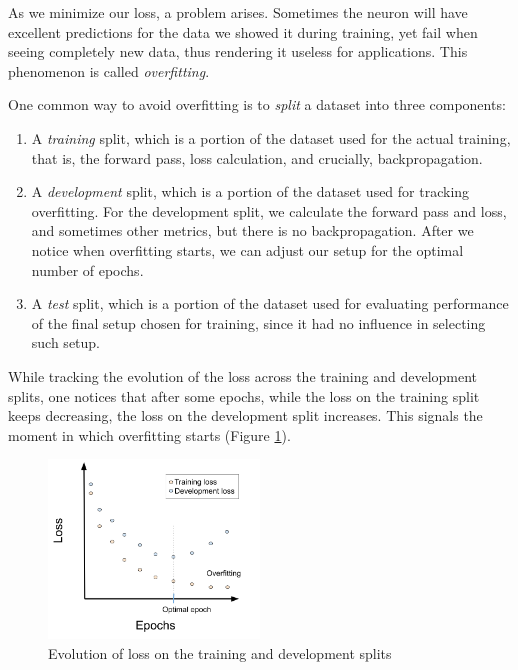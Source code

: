 
\label{02_nn_overfitting}

As we minimize our loss, a problem arises. Sometimes the neuron will have excellent predictions for the data we showed it during training, yet  fail when seeing completely new data, thus rendering it useless for applications. This phenomenon is called \emph{overfitting}. 

One common way to avoid overfitting is to \emph{split} a dataset into three components:

\begin{enumerate}
    \item A \emph{training} split, which is a portion of the dataset used for the actual training, that is, the forward pass, loss calculation, and crucially, backpropagation.
    \item A \emph{development} split, which is a portion of the dataset used for tracking overfitting. For the development split, we calculate the forward pass and loss, and sometimes other metrics, but there is no backpropagation. After we notice when overfitting starts, we can adjust our setup for the optimal number of epochs.
    \item A \emph{test} split, which is a portion of the dataset used for evaluating performance of the final setup chosen for training, since it had no influence in selecting such setup.
\end{enumerate}

While tracking the evolution of the loss across the training and development splits, one notices that after some epochs, while the loss on the training split keeps decreasing, the loss on the development split increases. This signals the moment in which overfitting starts (Figure \ref{fig:02_nn_split_loss_evolution}).

\begin{figure}
    \centering
    \includegraphics[width=0.5\textwidth]{Figures/02/02_split_loss_evolution.png}
    \caption{Evolution of loss on the training and development splits}
    \label{fig:02_nn_split_loss_evolution}
\end{figure}



